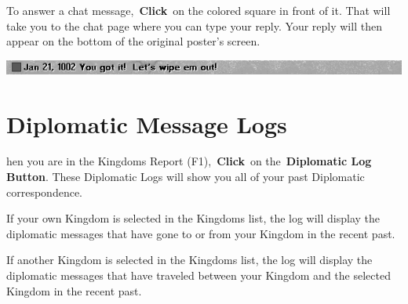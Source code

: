 To answer a chat message, \textbf{Click} on the colored square in front of it. That will take you to the chat page where you can type your reply. Your reply will then appear on the bottom of the original poster’s screen.

\begin{center}
	\includegraphics[width=0.7\linewidth]{Imutlichat_message}
\end{center}

\section{Diplomatic Message Logs}


hen you are in the Kingdoms Report (F1), \textbf{Click} on the \textbf{Diplomatic Log Button}. These Diplomatic Logs will show you all of your past Diplomatic correspondence.

If your own Kingdom is selected in the Kingdoms list, the log will display the diplomatic messages that have gone to or from your Kingdom in the recent past.

If another Kingdom is selected in the Kingdoms list, the log will display the diplomatic messages that have traveled between your Kingdom and the selected Kingdom in the recent past.